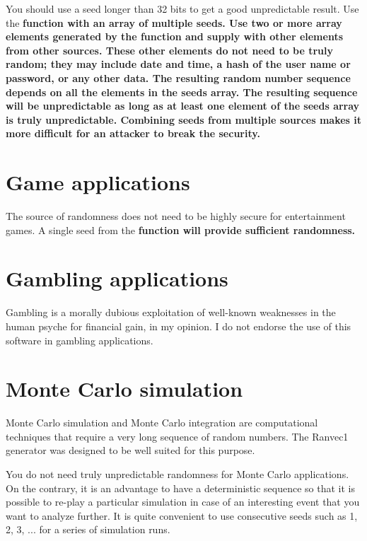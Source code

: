 \documentclass[11pt,a4paper,oneside,openright]{report}
\newcommand{\vspacesmall}{\vspace{3mm}}
\newcommand{\codei}[1]{\bfseries \ttfamily{#1}\normalfont}
\begin{document}
You should use a seed longer than 32 bits to get a good unpredictable result. Use the \codei{initByArray} function with an array of multiple seeds. Use two or more array elements generated by the \codei{physicalSeed()} function and supply with other elements from other sources. These other elements do not need to be truly random; they may include date and time, a hash of the user name or password, or any other data. The resulting random number sequence depends on all the elements in the seeds array. The resulting sequence will be unpredictable as long as at least one element of the seeds array is truly unpredictable. Combining seeds from multiple sources makes it more difficult for an attacker to break the security.
\vspacesmall


\section{Game applications}\label{GameApplications}
The source of randomness does not need to be highly secure for entertainment games. A single seed from the \codei{physicalSeed()} function will provide sufficient randomness. 
\vspacesmall


\section{Gambling applications}\label{GamblingApplications}
Gambling is a morally dubious exploitation of well-known weaknesses in the human psyche for financial gain, in my opinion. I do not endorse the use of this software in gambling applications.
\vspacesmall


\section{Monte Carlo simulation}\label{MonteCarloSimulation}
Monte Carlo simulation and Monte Carlo integration are computational techniques that require a very long sequence of random numbers. The Ranvec1 generator was designed to be well suited for this purpose. 
\vspacesmall

You do not need truly unpredictable randomness for Monte Carlo applications. On the contrary, it is an advantage to have a deterministic sequence so that it is possible to re-play a particular simulation in case of an interesting event that you want to analyze further. It is quite convenient to use consecutive seeds such as 1, 2, 3, ... for a series of simulation runs.
\vspacesmall
\end{document}
